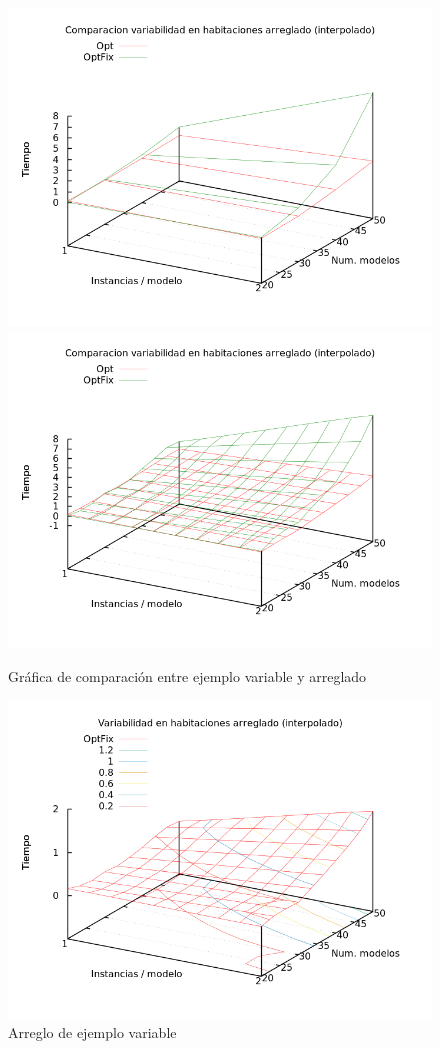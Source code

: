 \begin{figure}[H]
\centering
\includegraphics[scale=0.5]{img/opt-varfix}
\includegraphics[scale=0.5]{img/opt-varfix-cmp-spl}
\caption{Gráfica de comparación entre ejemplo variable y arreglado
\label{fig:grfvarfixcmp}}
\end{figure}



\begin{figure}[H]
\centering
\includegraphics[scale=0.5]{img/opt-varfix-spl}
\caption{Arreglo de ejemplo variable
\label{fig:grfvarfix}}
\end{figure}
